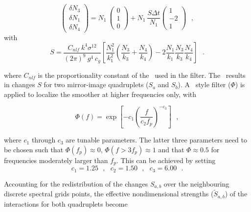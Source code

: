 \begin{equation}
\left ( \begin{array}{l} \delta N_3 \\ \delta N_1 \\ \delta N_4 
\end{array} \right ) = 
N_1 \: \left ( \begin{array}{c} 0 \\ 1 \\ 0 \end{array} \right ) +
N_1 \:  \frac{S \Delta t}{N_1}
\left ( \begin{array}{r} 1 \\ -2 \\ 1 \end{array} \right )
 \:\:\: , \label{eq:nls_dist}
\end{equation}
with
\begin{equation}
S = \frac{C_{nlf} \: k^4 \sigma^{12} }{(2\pi)^9 \: g^4 \: c_g }
\left [ \frac{N_1^2}{k_1^2}  \left ( \frac{N_3}{k_3}+\frac{N_4}{k_4} \right ) 
               - 2 \frac{N_1}{k_1} \frac{N_3}{k_3} \frac{N_4}{k_4} \right ]
\:\:\: . \label{eq:nls_S}
\end{equation}

\noindent 
where $C_{nlf}$ is the proportionality constant of the \dia\ used in the
filter.  The \dia\ results in changes $S$ for two mirror-image quadruplets
($S_a$ and $S_b$). A \js\ style filter ($\Phi$) is applied to localize the
smoother at higher frequencies only, with


\begin{equation}
\Phi(f) = \exp \left [ -c_1 \left ( \frac{f}{c_2 f_p} \right ) ^ {-c_3}
               \right ] \:\:\: ,
\label{eq:nls_filter}
\end{equation}

\noindent
where $c_1$ through $c_3$ are tunable parameters.  The latter three parameters
need to be chosen such that $\Phi(f_p) \approx 0$, $\Phi(f > 3f_p) \approx 1$
and that $\Phi \approx 0.5$ for frequencies moderately larger than $f_p$. This
can be achieved by setting
\begin{equation}
c_1 = 1.25 \:\:\: , \:\:\: c_2 = 1.50 \:\:\: , \:\:\: c_3 = 6.00 \:\:\: .
\label{eq:nls_f_parms}
\end{equation}

\noindent 
Accounting for the redistribution of the changes $S_{a,b}$ over the
neighbouring discrete spectral grids points, the effective nondimensional
strengths ($\tilde{S}_{a,b}$) of the interactions for both quadruplets become

